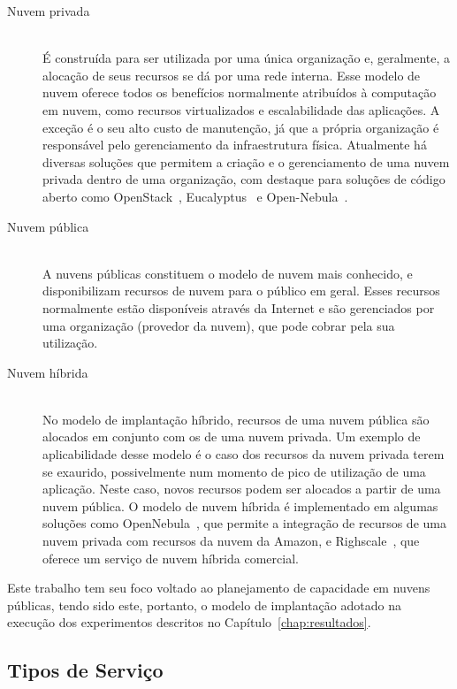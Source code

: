 \begin{description}
\item[Nuvem privada] \hfill \\ É construída para ser utilizada por uma única 
organização e, geralmente, a alocação de seus recursos se dá por uma rede interna. 
Esse modelo de nuvem oferece todos os benefícios normalmente atribuídos à computação 
em nuvem, como recursos virtualizados e escalabilidade das aplicações. A exceção 
é o seu alto custo de manutenção, já que a própria organização é responsável pelo 
gerenciamento da infraestrutura física. Atualmente há diversas soluções que permitem 
a criação e o gerenciamento de uma nuvem privada dentro de uma organização, com 
destaque para soluções de código aberto como OpenStack~\cite{openstack}, 
Eucalyptus~\cite{eucalyptus} e Open-Nebula~\cite{opennebula}.

\item[Nuvem pública] \hfill \\ A nuvens públicas constituem o modelo de nuvem 
mais conhecido, e disponibilizam recursos de nuvem para o público em geral. Esses 
recursos normalmente estão disponíveis através da Internet e são gerenciados por 
uma organização (provedor da nuvem), que pode cobrar pela sua utilização. 

\item[Nuvem híbrida] \hfill \\ No modelo de implantação híbrido, recursos de uma 
nuvem pública são alocados em conjunto com os de uma nuvem privada. Um exemplo de 
aplicabilidade desse modelo é o caso dos recursos da nuvem privada terem se exaurido,
possivelmente num momento de pico de utilização de uma aplicação. Neste caso, 
novos recursos podem ser alocados a partir de uma nuvem pública. O modelo de 
nuvem híbrida é implementado em algumas soluções como OpenNebula~\cite{opennebula}, 
que permite a integração de recursos de uma nuvem privada com recursos da nuvem 
da Amazon, e Righscale~\cite{rightscale}, que oferece um serviço de nuvem híbrida 
comercial.
\end{description}

Este trabalho tem seu foco voltado ao planejamento de capacidade em
nuvens públicas, tendo sido este, portanto, o modelo de implantação adotado na execução
dos experimentos descritos no Capítulo~\ref{chap:resultados}. 

\subsection{Tipos de Serviço}

